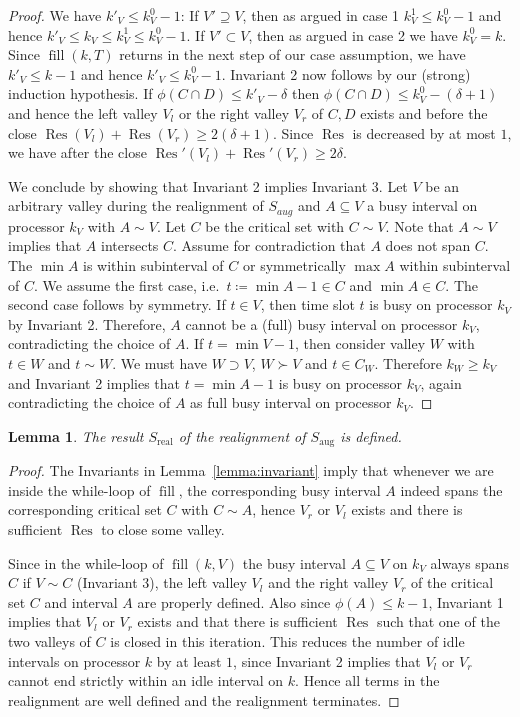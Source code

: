 \documentclass[a4paper]{article}
\DeclareMathOperator{\aug}{aug}
\DeclareMathOperator{\real}{real}
\DeclareMathOperator{\fillop}{fill}
\DeclareMathOperator{\res}{Res}
\newtheorem{lemma}[theorem]{Lemma}
\begin{document}
\begin{proof}
      We have $k'_V \leq k^0_V - 1$:
      If $V' \supseteq V$, then as argued in case 1 $k^1_V \leq k^0_V - 1$ and hence $k'_V \leq k_V \leq k^1_V \leq k^0_V -1$.
      If $V' \subset V$, then as argued in case 2 we have $k^0_V = k$.
      Since $\fillop(k, T)$ returns in the next step of our case assumption, we have $k'_V \leq k - 1$ and hence $k'_V \leq k^0_V -1$.
      Invariant 2 now follows by our (strong) induction hypothesis.
      If $\phi(C \cap D) \leq k'_V - \delta$ then $\phi(C \cap D) \leq k^0_V - (\delta + 1)$ and hence the left valley $V_l$ or the right valley $V_r$ of $C, D$ exists and before the close $\res(V_l) + \res(V_r) \geq 2 (\delta + 1)$.
      Since $\res$ is decreased by at most $1$, we have after the close $\res'(V_l) + \res'(V_r) \geq 2 \delta$.

  We conclude by showing that Invariant 2 implies Invariant 3.
  Let $V$ be an arbitrary valley during the realignment of $S_{aug}$ and $A \subseteq V$ a busy interval on processor $k_V$ with $A \sim V$.
  Let $C$ be the critical set with $C \sim V$.
  Note that $A \sim V$ implies that $A$ intersects $C$.
  Assume for contradiction that $A$ does not span $C$.
  The $\min A$ is within subinterval of $C$ or symmetrically $\max A$ within subinterval of $C$.
  We assume the first case, i.e.\ $t\coloneqq \min A - 1 \in C$ and $\min A \in C$.
  The second case follows by symmetry.
  If $t \in V$, then time slot $t$ is busy on processor $k_V$ by Invariant 2.
  Therefore, $A$ cannot be a (full) busy interval on processor $k_V$, contradicting the choice of $A$.
  If $t = \min V-1$, then consider valley $W$ with $t \in W$ and $t \sim W$.
  We must have $W \supset V$, $W \succ V$ and $t \in C_W$.
  Therefore $k_W \geq k_V$ and Invariant 2 implies that $t = \min A - 1$ is busy on processor $k_V$, again contradicting the choice of $A$ as full busy interval on processor $k_V$.
\end{proof}

\begin{lemma}\label{lemma:s_real}
  The result $S_{\real}$ of the realignment of $S_{\aug}$ is defined.
\end{lemma}
\begin{proof}
  The Invariants in Lemma~\ref{lemma:invariant} imply that whenever we are inside the while-loop of $\fillop$, the corresponding busy interval $A$ indeed spans the corresponding critical set $C$ with $C \sim A$, hence $V_r$ or $V_l$ exists and there is sufficient $\res$ to close some valley.

  Since in the while-loop of $\fillop(k, V)$ the busy interval $A \subseteq V$ on $k_V$ always spans $C$ if $V \sim C$ (Invariant 3), the left valley $V_l$ and the right valley $V_r$ of the critical set $C$ and interval $A$ are properly defined.
  Also since $\phi(A) \leq k - 1$, Invariant 1 implies that $V_l$ or $V_r$ exists and that there is sufficient $\res$ such that one of the two valleys of $C$ is closed in this iteration.
  This reduces the number of idle intervals on processor $k$ by at least $1$, since Invariant 2 implies that $V_l$ or $V_r$ cannot end strictly within an idle interval on $k$.
  Hence all terms in the realignment are well defined and the realignment terminates.
\end{proof}
\end{document}
